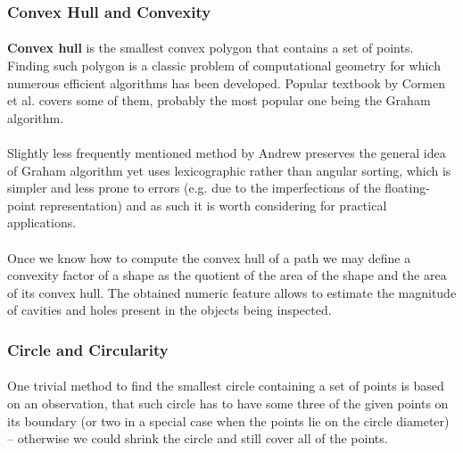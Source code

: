 \subsubsection{Convex Hull and Convexity}

\paragraph*{}
\textbf{Convex hull} is the smallest convex polygon that contains a set of points. Finding such polygon is a classic problem of computational geometry for which numerous efficient algorithms has been developed. Popular textbook by Cormen et al. covers\cite{Cormen01} some of them, probably the most popular one being the Graham algorithm.

\paragraph*{}
Slightly less frequently mentioned method\cite{Andrew79} by Andrew preserves the general idea of Graham algorithm yet uses lexicographic rather than angular sorting, which is simpler and less prone to errors (e.g. due to the imperfections of the floating-point representation) and as such it is worth considering for practical applications.

\paragraph*{}
Once we know how to compute the convex hull of a path we may define a convexity factor of a shape as the quotient of the area of the shape and the area of its convex hull. The obtained numeric feature allows to estimate the magnitude of cavities and holes present in the objects being inspected.

\subsubsection{Circle and Circularity}

\paragraph*{}
One trivial method to find the smallest circle containing a set of points is based on an observation, that such circle has to have some three of the given points on its boundary (or two in a special case when the points lie on the circle diameter) -- otherwise we could shrink the circle and still cover all of the points. 

